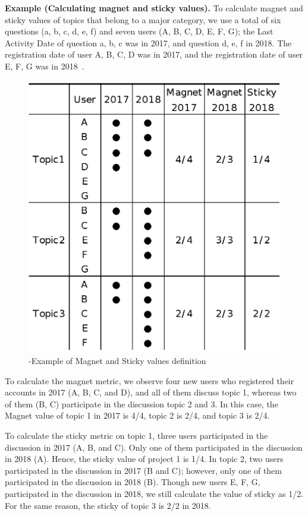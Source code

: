 \documentclass[english,preprint,JIP,technote]{ipsj}
\begin{document}
\noindent
\textbf{Example (Calculating magnet and sticky values).}
To calculate magnet and sticky values of topics that belong to a major category, we use a total of six questions (a, b, c, d, e, f) and seven users (A, B, C, D, E, F, G); the Last Activity Date of question a, b, c was in 2017, and question d, e, f in 2018. The registration date of user A, B, C, D was in 2017, and the registration date of user E, F, G was in 2018~\cite{yamashita2016magnet}.

\begin{figure}[t]
 \centering
 \includegraphics[width=.75\hsize]{img/explainofMS.eps}  
 \caption{-Example of Magnet and Sticky values definition} 
 \label{fig:example2} 
\end{figure}


To calculate the magnet metric, we observe four new users who registered their accounts in 2017 (A, B, C, and D), and all of them discuss topic 1, whereas two of them (B, C) participate in the discussion topic 2 and 3. In this case, the Magnet value of topic 1 in 2017 is 4/4, topic 2 is 2/4, and topic 3 is 2/4.

To calculate the sticky metric on topic 1, three users participated in the discussion in 2017 (A, B, and C). Only one of them participated in the discussion in 2018 (A). Hence, the sticky value of project 1 is 1/4. In topic 2, two users participated in the discussion in 2017 (B and C); however, only one of them participated in the discussion in 2018 (B). Though new users E, F, G, participated in the discussion in 2018, we still calculate the value of sticky as 1/2. For the same reason, the sticky of topic 3 is 2/2 in 2018.\\
\end{document}
